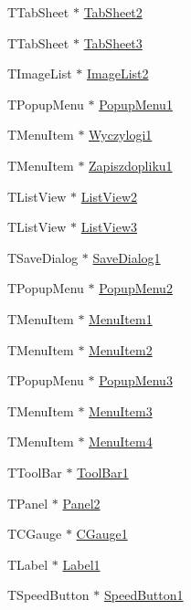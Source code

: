 \begin{CompactItemize}
\item 
TTabSheet $\ast$ \hyperlink{classTForm1_bda9626de3a565ada75590e2a4072adb}{TabSheet2}
\item 
TTabSheet $\ast$ \hyperlink{classTForm1_9f711c2728656664dca851fae528647d}{TabSheet3}
\item 
TImageList $\ast$ \hyperlink{classTForm1_a1eb1de6f757fe4c219614eaa489d58c}{ImageList2}
\item 
TPopupMenu $\ast$ \hyperlink{classTForm1_2a7d717ee18c4392e29c02fb252d5edf}{PopupMenu1}
\item 
TMenuItem $\ast$ \hyperlink{classTForm1_9dcb2c2b046afeb5bd3d1e6110233ca1}{Wyczylogi1}
\item 
TMenuItem $\ast$ \hyperlink{classTForm1_9daa7303230ddb9903f9ed31489bf9bd}{Zapiszdopliku1}
\item 
TListView $\ast$ \hyperlink{classTForm1_f2bf95d7f40c9081bff58919fac42e27}{ListView2}
\item 
TListView $\ast$ \hyperlink{classTForm1_2ebb9796da3f2296c14d506af21d929e}{ListView3}
\item 
TSaveDialog $\ast$ \hyperlink{classTForm1_69479cd188c830cd26b871bc9d1bec6b}{SaveDialog1}
\item 
TPopupMenu $\ast$ \hyperlink{classTForm1_183d2be2116d1bd81ba3265063cd7862}{PopupMenu2}
\item 
TMenuItem $\ast$ \hyperlink{classTForm1_fa2b3db47d8e6084396230ca1faacae1}{MenuItem1}
\item 
TMenuItem $\ast$ \hyperlink{classTForm1_991d92316da7bc45269d39af1fd998e5}{MenuItem2}
\item 
TPopupMenu $\ast$ \hyperlink{classTForm1_8084e0041ff8d5eb21b5632b4caf5fff}{PopupMenu3}
\item 
TMenuItem $\ast$ \hyperlink{classTForm1_ef1f9c24509fa2b840942e0c522eaa49}{MenuItem3}
\item 
TMenuItem $\ast$ \hyperlink{classTForm1_1d34fca1a439e8d1b1899d0fd3734fa1}{MenuItem4}
\item 
TToolBar $\ast$ \hyperlink{classTForm1_0b61aacff668f8478628ce9fb2c7679f}{ToolBar1}
\item 
TPanel $\ast$ \hyperlink{classTForm1_1c581dd73461c34e5408cd163f026386}{Panel2}
\item 
TCGauge $\ast$ \hyperlink{classTForm1_3d74c84c60d687c60511fe44a7f04514}{CGauge1}
\item 
TLabel $\ast$ \hyperlink{classTForm1_c5a132daa716561ea42ea51c60c952e1}{Label1}
\item 
TSpeedButton $\ast$ \hyperlink{classTForm1_4910802fa9b4883b9e3991db1015c7ab}{SpeedButton1}

\end{CompactItemize}
